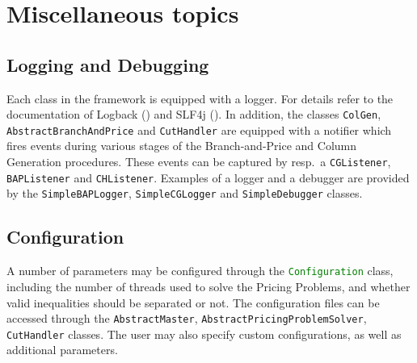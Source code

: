 \documentclass[a4paper]{article}
\newcommand{\code}[1]{\lstinline[language=java, style=seminar]!#1!}
\begin{document}
\section{Miscellaneous topics}

\subsection{Logging and Debugging}
Each class in the framework is equipped with a logger. For details refer to the documentation of Logback (\cite{logback}) and SLF4j (\cite{slf4j}). In addition, the classes \code{ColGen}, \code{AbstractBranchAndPrice} and \code{CutHandler} are equipped with a notifier which fires events during various stages of the Branch-and-Price and Column Generation procedures. These events can be captured by resp.\ a \code{CGListener}, \code{BAPListener} and \code{CHListener}. Examples of a logger and a debugger are provided by the \code{SimpleBAPLogger}, \code{SimpleCGLogger} and \code{SimpleDebugger} classes.

\subsection{Configuration}
A number of parameters may be configured through the \code{Configuration} class, including the number of threads used to solve the Pricing Problems, and whether valid inequalities should be separated or not. The configuration files can be accessed through the \code{AbstractMaster}, \code{AbstractPricingProblemSolver}, \code{CutHandler} classes. The user may also specify custom configurations, as well as additional parameters. 




\end{document}
